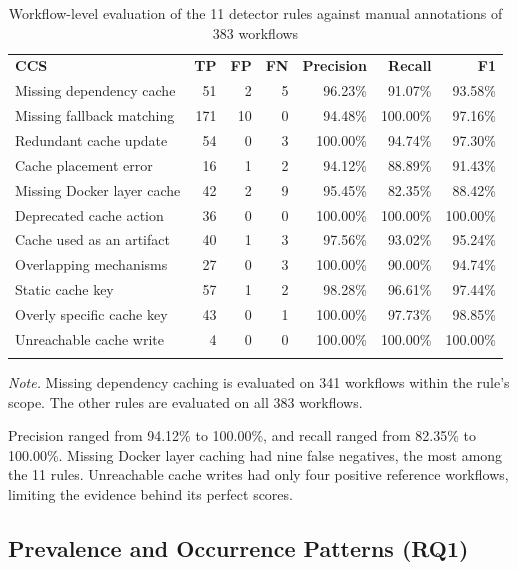 \documentclass[smallextended]{svjour3}
\begin{document}
\begin{table}[htbp]
\centering
\caption{Workflow-level evaluation of the 11 detector rules against manual annotations of 383 workflows}
\label{tab:detector-validation}
\scriptsize
\begin{tabular}{lrrrrrr}
\hline\noalign{\smallskip}
\textbf{CCS} & \textbf{TP} & \textbf{FP} & \textbf{FN} & \textbf{Precision} & \textbf{Recall} & \textbf{F1} \\
\noalign{\smallskip}\hline\noalign{\smallskip}
Missing dependency cache & 51 & 2 & 5 & 96.23\% & 91.07\% & 93.58\% \\
Missing fallback matching & 171 & 10 & 0 & 94.48\% & 100.00\% & 97.16\% \\
Redundant cache update & 54 & 0 & 3 & 100.00\% & 94.74\% & 97.30\% \\
Cache placement error & 16 & 1 & 2 & 94.12\% & 88.89\% & 91.43\% \\
Missing Docker layer cache & 42 & 2 & 9 & 95.45\% & 82.35\% & 88.42\% \\
Deprecated cache action & 36 & 0 & 0 & 100.00\% & 100.00\% & 100.00\% \\
Cache used as an artifact & 40 & 1 & 3 & 97.56\% & 93.02\% & 95.24\% \\
Overlapping mechanisms & 27 & 0 & 3 & 100.00\% & 90.00\% & 94.74\% \\
Static cache key & 57 & 1 & 2 & 98.28\% & 96.61\% & 97.44\% \\
Overly specific cache key & 43 & 0 & 1 & 100.00\% & 97.73\% & 98.85\% \\
Unreachable cache write & 4 & 0 & 0 & 100.00\% & 100.00\% & 100.00\% \\
\noalign{\smallskip}\hline
\end{tabular}
\par\smallskip
\parbox{\linewidth}{\footnotesize\emph{Note.} Missing dependency caching is evaluated on 341 workflows within the rule's scope. The other rules are evaluated on all 383 workflows.}
\end{table}

Precision ranged from 94.12\% to 100.00\%, and recall ranged from 82.35\% to 100.00\%. Missing Docker layer caching had nine false negatives, the most among the 11 rules. Unreachable cache writes had only four positive reference workflows, limiting the evidence behind its perfect scores.

\subsection{Prevalence and Occurrence Patterns (RQ1)}
\end{document}

